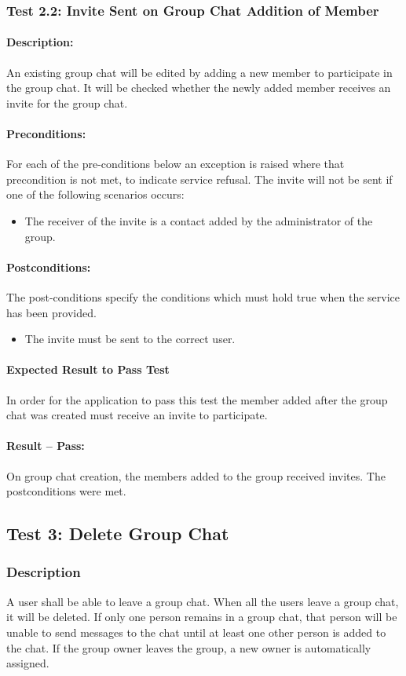 \documentclass[11pt]{article}
\begin{document}
\subsubsection{Test 2.2: Invite Sent on Group Chat Addition of Member}
\paragraph{Description:}
 An existing group chat will be edited by adding a new member to participate in the group chat. It will be checked whether the newly added member receives an invite for the group chat.
  \paragraph{Preconditions:} For each of the pre-conditions below an exception is raised where that precondition is not met, to indicate service refusal.
  The invite will not be sent if one of the following scenarios occurs:
  \begin{itemize}
  \item The receiver of the invite is a contact added by the administrator of the group.
  \end{itemize}
  \paragraph{Postconditions:} The post-conditions specify the conditions which must hold true when the service has been provided.
  \begin{itemize}
  \item The invite must be sent to the correct user.
  \end{itemize}
\paragraph{Expected Result to Pass Test}
In order for the application to pass this test the member added after the group chat was created must receive an invite to participate.
\paragraph{Result -- Pass:}
On group chat creation, the members added to the group received invites. The postconditions were met.
\subsection{Test 3: Delete Group Chat}
\subsubsection{Description}
A user shall be able to leave a group chat. When all the users leave a group chat, it will be deleted. If only one person remains in a group chat, that person will be unable to send messages to the chat until at least one other person is added to the chat. If the group owner leaves the group, a new owner is automatically assigned.
\end{document}
